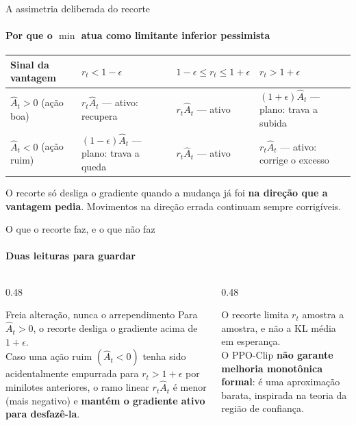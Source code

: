 \documentclass[aspectratio=169, 11pt]{beamer}
\newcommand{\Ahat}{\hat{A}}
\newcommand{\azul}[1]{{\color{rlAzulClaro}#1}}
\begin{document}
\begin{frame}{A assimetria deliberada do recorte}
  \framesubtitle{Por que o $\min$ atua como limitante inferior pessimista}

  \begin{center}\footnotesize\setlength{\tabcolsep}{4pt}
    \begin{tabular}{@{}p{}p{}p{}p{}@{}}
      \toprule
      \textbf{Sinal da vantagem} & $r_t < 1-\epsilon$ & $1-\epsilon\le r_t\le 1+\epsilon$ & $r_t > 1+\epsilon$ \\
      \midrule
      $\Ahat_t>0$ (ação boa) & $r_t\Ahat_t$ --- ativo: recupera & $r_t\Ahat_t$ --- ativo &
        {\color{rlLaranja}$(1+\epsilon)\Ahat_t$ --- plano: trava a subida} \\[0.3em]
      $\Ahat_t<0$ (ação ruim) & {\color{rlLaranja}$(1-\epsilon)\Ahat_t$ --- plano: trava a queda} &
        $r_t\Ahat_t$ --- ativo & \azul{$r_t\Ahat_t$ --- ativo: corrige o excesso} \\
      \bottomrule
    \end{tabular}
  \end{center}

  \begin{ideiabox}
    O recorte só desliga o gradiente quando a mudança já foi \textbf{na direção que a vantagem pedia}.
    Movimentos na direção errada continuam sempre corrigíveis.
  \end{ideiabox}
\end{frame}

\begin{frame}{O que o recorte faz, e o que não faz}
  \framesubtitle{Duas leituras para guardar}

  \begin{columns}[T]
    \begin{column}{0.48\textwidth}
      \begin{teobox}{Freia alteração, nunca o arrependimento}
        \small Para $\Ahat_t>0$, o recorte desliga o gradiente acima de $1+\epsilon$.\\[0.3em]
        Caso uma ação ruim $(\Ahat_t<0)$ tenha sido acidentalmente empurrada para $r_t>1+\epsilon$
        por minilotes anteriores, o ramo linear $r_t\Ahat_t$ é menor (mais negativo) e
        \textbf{mantém o gradiente ativo para desfazê-la}.
      \end{teobox}
    \end{column}
    \begin{column}{0.48\textwidth}
      \begin{alertabox}[title={Heurística vs. garantia teórica}]
        O recorte limita $r_t$ amostra a amostra, e não a KL média em esperança.\\[0.3em]
        O PPO-Clip \textbf{não garante melhoria monotônica formal}: é uma aproximação barata,
        inspirada na teoria da região de confiança.
      \end{alertabox}
    \end{column}
  \end{columns}
\end{frame}
\end{document}
